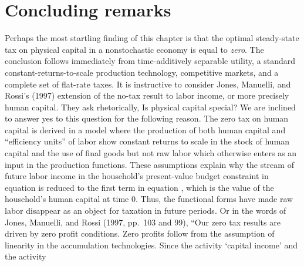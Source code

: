   
\section{Concluding remarks}
Perhaps the most startling finding of this chapter is that
the optimal steady-state tax on physical capital in a
nonstochastic economy is equal to {\it zero}. The conclusion
follows immediately from time-additively separable utility,
a standard constant-returns-to-scale production technology,
competitive markets, and a complete set of flat-rate taxes.
It is instructive to consider Jones, Manuelli, and Rossi's (1997)
extension of the no-tax result to labor income, or more precisely
human capital.  They ask rhetorically, Is physical capital special?
We are inclined to answer yes to this question for the following reason.
The zero tax on human capital is derived in a model where
the production of both human capital and ``efficiency units''
of labor show constant returns to scale in the stock of human
capital and the use of final goods but not raw labor
which otherwise enters as an input in the production functions.
These assumptions explain why the stream of future labor income
in the
household's present-value budget constraint in equation 
is reduced to the first term in equation , which is
the value of the household's human capital at time 0.
Thus, the functional forms have made raw labor
disappear as an object for taxation in future periods.
Or in the words of Jones, Manuelli, and Rossi (1997, pp.\ 103 and 99),
``Our zero tax results are
driven by zero profit conditions. Zero profits follow from
the assumption of linearity in the accumulation technologies.
Since the activity `capital income' and the activity
